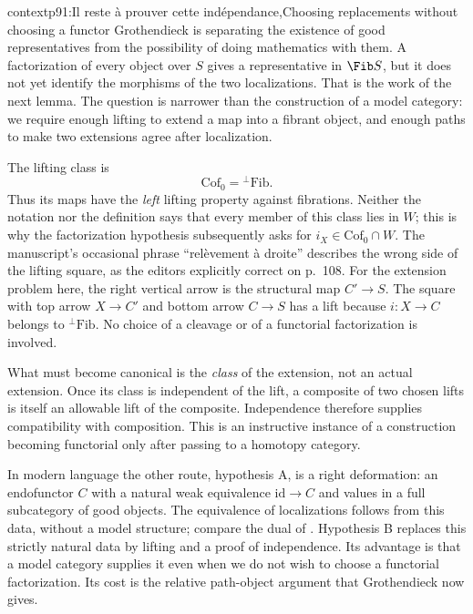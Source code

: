 \begin{dcomment}{context}{p91:Il reste à prouver cette indépendance,}{Choosing replacements without choosing a functor}
Grothendieck is separating the existence of good representatives from the possibility of doing mathematics with them. A factorization of every object over $S$ gives a representative in $\Fib S$, but it does not yet identify the morphisms of the two localizations. That is the work of the next lemma. The question is narrower than the construction of a model category: we require enough lifting to extend a map into a fibrant object, and enough paths to make two extensions agree after localization.

The lifting class is
\[
 \mathrm{Cof}_0={}^{\perp}\mathrm{Fib}.
\]
Thus its maps have the \emph{left} lifting property against fibrations. Neither the notation nor the definition says that every member of this class lies in $W$; this is why the factorization hypothesis subsequently asks for $i_X\in\mathrm{Cof}_0\cap W$. The manuscript's occasional phrase ``relèvement à droite'' describes the wrong side of the lifting square, as the editors explicitly correct on p.~108. For the extension problem here, the right vertical arrow is the structural map $C'\to S$. The square with top arrow $X\to C'$ and bottom arrow $C\to S$ has a lift because $i:X\to C$ belongs to ${}^{\perp}\mathrm{Fib}$. No choice of a cleavage or of a functorial factorization is involved.

What must become canonical is the \emph{class} of the extension, not an actual extension. Once its class is independent of the lift, a composite of two chosen lifts is itself an allowable lift of the composite. Independence therefore supplies compatibility with composition. This is an instructive instance of a construction becoming functorial only after passing to a homotopy category.

In modern language the other route, hypothesis A, is a right deformation: an endofunctor $C$ with a natural weak equivalence $\mathrm{id}\to C$ and values in a full subcategory of good objects. The equivalence of localizations follows from this data, without a model structure; compare the dual of \citet[Definition~2.2.1 and Remark~2.2.2]{Riehl2014}. Hypothesis B replaces this strictly natural data by lifting and a proof of independence. Its advantage is that a model category supplies it even when we do not wish to choose a functorial factorization. Its cost is the relative path-object argument that Grothendieck now gives.
\end{dcomment}

